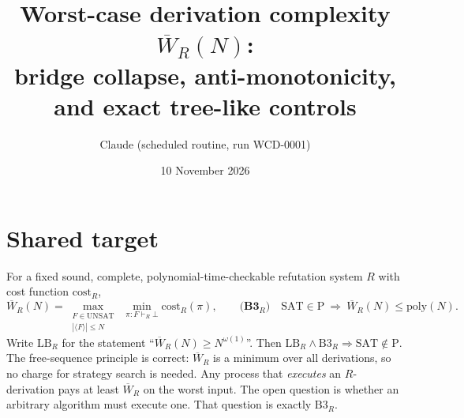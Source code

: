 \documentclass[11pt]{article}
\title{Worst-case derivation complexity $\overline W_R(N)$:\\
bridge collapse, anti-monotonicity, and exact tree-like controls}
\author{Claude (scheduled routine, run WCD-0001)}
\date{10 November 2026}
\begin{document}
\maketitle

\begin{center}\end{center}

\section{Shared target}
For a fixed sound, complete, polynomial-time-checkable refutation system $R$ with
cost function $\mathrm{cost}_R$,
\[
\overline W_R(N)=\max_{\substack{F\in\mathrm{UNSAT}\\ |\langle F\rangle|\le N}}
\ \min_{\pi:F\vdash_R\bot}\mathrm{cost}_R(\pi),
\qquad
\textbf{(B3$_R$)}\quad \mathrm{SAT}\in\mathrm P\ \Longrightarrow\ \overline W_R(N)\le\mathrm{poly}(N).
\]
Write $\mathrm{LB}_R$ for the statement ``$\overline W_R(N)\ge N^{\omega(1)}$''.
Then $\mathrm{LB}_R\wedge\mathrm{B3}_R\Rightarrow\mathrm{SAT}\notin\mathrm P$.
The free-sequence principle is correct: $\overline W_R$ is a minimum over all
derivations, so no charge for strategy search is needed. Any process that
\emph{executes} an $R$-derivation pays at least $\overline W_R$ on the worst input.
The open question is whether an arbitrary algorithm must execute one. That
question is exactly $\mathrm{B3}_R$.
\end{document}
